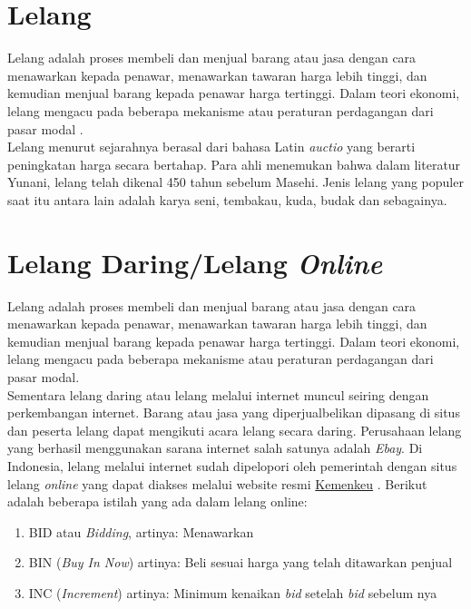 	\section{  Lelang}
	Lelang adalah proses membeli dan menjual barang atau jasa dengan cara menawarkan kepada penawar, menawarkan tawaran harga lebih tinggi, dan kemudian menjual barang kepada penawar harga tertinggi. Dalam teori ekonomi, lelang mengacu pada beberapa mekanisme atau peraturan perdagangan dari pasar modal \cite{balailelang_sejarah_nodate}.
	\\ \indent
	Lelang menurut sejarahnya berasal dari bahasa Latin \textit{auctio} yang berarti peningkatan harga secara bertahap. Para ahli menemukan bahwa dalam literatur Yunani, lelang telah dikenal 450 tahun sebelum Masehi. Jenis lelang yang populer saat itu antara lain adalah karya seni, tembakau, kuda, budak dan sebagainya\cite{pratama_lelang_2012}.
	   
	\section{  Lelang Daring/Lelang \textit{Online}}
	Lelang adalah proses membeli dan menjual barang atau jasa dengan cara menawarkan kepada penawar, menawarkan tawaran harga lebih tinggi, dan kemudian menjual barang kepada penawar harga tertinggi. Dalam teori ekonomi, lelang mengacu pada beberapa mekanisme atau peraturan perdagangan dari pasar modal. \\
	\indent Sementara lelang daring atau lelang melalui internet muncul seiring dengan perkembangan internet. Barang atau jasa yang diperjualbelikan dipasang di situs dan peserta lelang dapat mengikuti acara lelang secara daring. Perusahaan lelang yang berhasil menggunakan sarana internet salah satunya adalah \textit{Ebay}. Di Indonesia, lelang melalui internet sudah dipelopori oleh pemerintah dengan situs lelang \textit{online} yang dapat diakses melalui website resmi \href{https://www.lelangdjkn.kemenkeu.go.id}{Kemenkeu} \cite{wikipedia_lelang_2016}. 
	Berikut adalah beberapa istilah yang ada dalam lelang online:
	\begin{enumerate}
	      	\item BID atau \textit{Bidding}, artinya: Menawarkan
	      	\item BIN (\textit{Buy In Now}) artinya: Beli sesuai harga yang telah ditawarkan penjual
	      	\item INC (\textit{Increment}) artinya: Minimum kenaikan \textit{bid} setelah \textit{bid} sebelum nya \cite{noauthor_arti_nodate}
	\end{enumerate}

